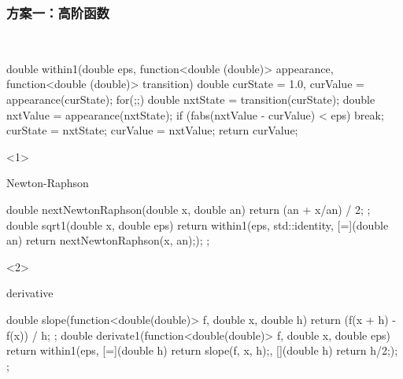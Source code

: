 \documentclass[UTF8,lualatex]{ctexbeamer}
\begin{document}
\begin{frame}[fragile,t]
    \frametitle{方案一：高阶函数}
    \vspace{-0.5cm}
    \scriptsize
    \begin{block}{~}
        \begin{cppcode}
        double within1(double eps, function<double (double)> appearance,
          function<double (double)> transition) {
          double curState = 1.0, curValue = appearance(curState);
          for(;;) {
            double nxtState = transition(curState);
            double nxtValue = appearance(nxtState);
            if (fabs(nxtValue - curValue) < eps) break;
            curState = nxtState;
            curValue = nxtValue;
          }
          return curValue;
        }
        \end{cppcode}
    \end{block}
    \begin{onlyenv}<1>
        \begin{block}{Newton-Raphson}
            \begin{cppcode}
                double nextNewtonRaphson(double x, double an) {
                  return (an + x/an) / 2;
                };
                double sqrt1(double x, double eps) {
                  return within1(eps,
                    std::identity,
                    [=](double an) {return nextNewtonRaphson(x, an);});
                };
            \end{cppcode}
        \end{block}
    \end{onlyenv}
    \begin{onlyenv}<2>
        \begin{block}{derivative}
            \begin{cppcode}
                double slope(function<double(double)> f, double x, double h) {
                  return (f(x + h) - f(x)) / h;
                };
                double derivate1(function<double(double)> f, double x, double eps) {
                  return within1(eps,
                    [=](double h) {return slope(f, x, h);},
                    [](double h) { return h/2;});
                };
            \end{cppcode}
        \end{block}
    \end{onlyenv}
\end{frame}
\end{document}
